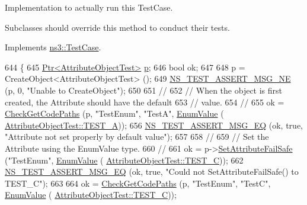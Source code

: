 Implementation to actually run this Test\+Case. 

Subclasses should override this method to conduct their tests. 

Implements \hyperlink{classns3_1_1TestCase_a8ff74680cf017ed42011e4be51917a24}{ns3\+::\+Test\+Case}.


\begin{DoxyCode}
644 \{
645   \hyperlink{classns3_1_1Ptr}{Ptr<AttributeObjectTest>} \hyperlink{lte__link__budget_8m_ac9de518908a968428863f829398a4e62}{p};
646   \textcolor{keywordtype}{bool} ok;
647 
648   p = CreateObject<AttributeObjectTest> ();
649   \hyperlink{group__testing_ga73d66fb0050a5111453fd144e767b91a}{NS\_TEST\_ASSERT\_MSG\_NE} (p, 0, \textcolor{stringliteral}{"Unable to CreateObject"});
650 
651   \textcolor{comment}{//}
652   \textcolor{comment}{// When the object is first created, the Attribute should have the default }
653   \textcolor{comment}{// value.}
654   \textcolor{comment}{//}
655   ok = \hyperlink{classAttributeTestCase_a902fb84c803f1c898329f9263575331e}{CheckGetCodePaths} (p, \textcolor{stringliteral}{"TestEnum"}, \textcolor{stringliteral}{"TestA"}, \hyperlink{classns3_1_1EnumValue}{EnumValue} (
      \hyperlink{classAttributeObjectTest_a7d0dfe3f27ac6d9338a92781caf287cbac83a7f877302882c60d200cc9cc67abe}{AttributeObjectTest::TEST\_A}));
656   \hyperlink{group__testing_ga2a9d78cffb3db8e867c35fff0b698cf5}{NS\_TEST\_ASSERT\_MSG\_EQ} (ok, \textcolor{keyword}{true}, \textcolor{stringliteral}{"Attribute not set properly by default value"});
657 
658   \textcolor{comment}{//}
659   \textcolor{comment}{// Set the Attribute using the EnumValue type.}
660   \textcolor{comment}{//}
661   ok = p->\hyperlink{classns3_1_1ObjectBase_aa7d333004e970f925a4ed5df275541b5}{SetAttributeFailSafe} (\textcolor{stringliteral}{"TestEnum"}, \hyperlink{classns3_1_1EnumValue}{EnumValue} (
      \hyperlink{classAttributeObjectTest_a7d0dfe3f27ac6d9338a92781caf287cba34f22f94dd4e890a10784749d81ea296}{AttributeObjectTest::TEST\_C}));
662   \hyperlink{group__testing_ga2a9d78cffb3db8e867c35fff0b698cf5}{NS\_TEST\_ASSERT\_MSG\_EQ} (ok, \textcolor{keyword}{true}, \textcolor{stringliteral}{"Could not SetAttributeFailSafe() to TEST\_C"});
663 
664   ok = \hyperlink{classAttributeTestCase_a902fb84c803f1c898329f9263575331e}{CheckGetCodePaths} (p, \textcolor{stringliteral}{"TestEnum"}, \textcolor{stringliteral}{"TestC"}, \hyperlink{classns3_1_1EnumValue}{EnumValue} (
      \hyperlink{classAttributeObjectTest_a7d0dfe3f27ac6d9338a92781caf287cba34f22f94dd4e890a10784749d81ea296}{AttributeObjectTest::TEST\_C}));

\end{DoxyCode}
